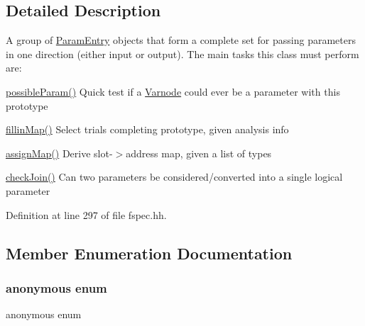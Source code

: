 \subsection{Detailed Description}
A group of \mbox{\hyperlink{class_param_entry}{Param\+Entry}} objects that form a complete set for passing parameters in one direction (either input or output). The main tasks this class must perform are\+:
\begin{DoxyItemize}
\item \mbox{\hyperlink{class_param_list_a77bf29c2bd3fe17be0e8200af97c50d9}{possible\+Param()}} Quick test if a \mbox{\hyperlink{class_varnode}{Varnode}} could ever be a parameter with this prototype
\item \mbox{\hyperlink{class_param_list_aaf2680343e933767d7ffd38e22e84011}{fillin\+Map()}} Select trials completing prototype, given analysis info
\item \mbox{\hyperlink{class_param_list_ab30f200d65a2c66f434506acc77d384e}{assign\+Map()}} Derive slot-\/$>$address map, given a list of types
\item \mbox{\hyperlink{class_param_list_afbd77bcf71722f89a9ad9f4d9d20bdc5}{check\+Join()}} Can two parameters be considered/converted into a single logical parameter 
\end{DoxyItemize}

Definition at line 297 of file fspec.\+hh.



\subsection{Member Enumeration Documentation}
\mbox{\label{class_param_list_a2aa16823d6e3b1c3c709e5540a8dcc3a}} 
\subsubsection{\texorpdfstring{anonymous enum}{anonymous enum}}
{\footnotesize\ttfamily anonymous enum}

